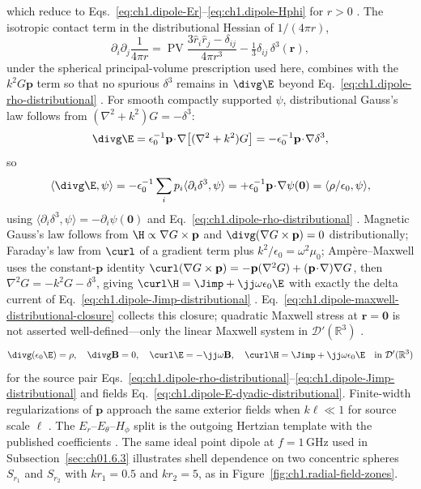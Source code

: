 which reduce to Eqs.~\eqref{eq:ch1.dipole-Er}--\eqref{eq:ch1.dipole-Hphi} for $r>0$ \cite{stratton1941,harrington2001,yaghjian1982}. The isotropic contact term in the distributional Hessian of $1/(4\pi r)$,
\[
\partial_i\partial_j\frac{1}{4\pi r}
=\operatorname{PV}\!\frac{3\hat r_i\hat r_j-\delta_{ij}}{4\pi r^{3}}
-\tfrac13\delta_{ij}\,\delta^{3}(\mathbf{r}),
\]
under the spherical principal-volume prescription used here, combines with the $k^{2}G\mathbf{p}$ term so that no spurious $\delta^{3}$ remains in $\divg\E$ beyond Eq.~\eqref{eq:ch1.dipole-rho-distributional} \cite{yaghjian1980dyadic,yaghjian1982}. For smooth compactly supported $\psi$, distributional Gauss's law follows from $(\nabla^2+k^2)G=-\delta^{3}$:
\[
\divg\E=\epsilon_0^{-1}\mathbf{p}\!\cdot\!\nabla\big[(\nabla^2+k^2)G\big]
=-\epsilon_0^{-1}\mathbf{p}\!\cdot\!\nabla\delta^{3},
\]
so
\[
\langle\divg\E,\psi\rangle
=-\epsilon_0^{-1}\sum_i p_i\langle\partial_i\delta^{3},\psi\rangle
=+\epsilon_0^{-1}\mathbf{p}\!\cdot\!\nabla\psi(\mathbf{0})
=\langle\rho/\epsilon_0,\psi\rangle,
\]
using $\langle\partial_i\delta^{3},\psi\rangle=-\partial_i\psi(\mathbf{0})$ and Eq.~\eqref{eq:ch1.dipole-rho-distributional} \cite{yaghjian1982,stratton1941}. Magnetic Gauss's law follows from $\H\propto\nabla G\times\mathbf{p}$ and $\divg(\nabla G\times\mathbf{p})=0$ distributionally; Faraday's law from $\curl$ of a gradient term plus $k^2/\epsilon_0=\omega^2\mu_0$; Amp\`ere--Maxwell uses the constant-$\mathbf{p}$ identity $\curl(\nabla G\times\mathbf{p})=-\mathbf{p}(\nabla^2 G)+(\mathbf{p}\!\cdot\!\nabla)\nabla G$, then $\nabla^2 G=-k^2G-\delta^{3}$, giving $\curl\H=\Jimp+\jj\omega\epsilon_0\E$ with exactly the delta current of Eq.~\eqref{eq:ch1.dipole-Jimp-distributional} \cite{yaghjian1982,harrington2001}. Eq.~\eqref{eq:ch1.dipole-maxwell-distributional-closure} collects this closure; quadratic Maxwell stress at $\mathbf{r}=\mathbf{0}$ is not asserted well-defined---only the linear Maxwell system in $\mathcal{D}'(\mathbb{R}^{3})$ \cite{yaghjian1980dyadic,stratton1941}.
\begin{equation}
\label{eq:ch1.dipole-maxwell-distributional-closure}
\divg(\epsilon_0\E)=\rho,\quad \divg\mathbf{B}=0,\quad \curl\E=-\jj\omega\mathbf{B},\quad \curl\H=\Jimp+\jj\omega\epsilon_0\E
\quad\text{in }\mathcal{D}'(\mathbb{R}^{3})
\end{equation}
for the source pair Eqs.~\eqref{eq:ch1.dipole-rho-distributional}--\eqref{eq:ch1.dipole-Jimp-distributional} and fields Eq.~\eqref{eq:ch1.dipole-E-dyadic-distributional}.
Finite-width regularizations of $\mathbf{p}$ approach the same exterior fields when $k\ell\ll1$ for source scale $\ell$ \cite{stratton1941,harrington2001,yaghjian1982}. The $E_r$--$E_\theta$--$H_\phi$ split is the outgoing Hertzian template with the published coefficients \cite{stratton1941,harrington2001}. The same ideal point dipole at
$f=1\,\mathrm{GHz}$ used in Subsection~\ref{sec:ch01.6.3} illustrates shell dependence on
two concentric spheres $S_{r_1}$ and $S_{r_2}$ with $kr_1=0.5$ and $kr_2=5$, as in Figure~\ref{fig:ch1.radial-field-zones}.


